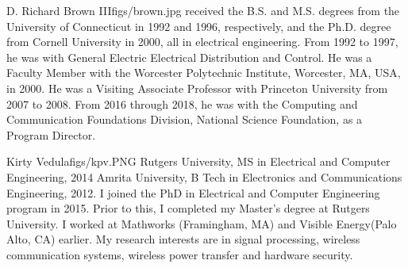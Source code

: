 \documentclass[twocolumn,letterpaper]{IEEEAerospaceCLS}  %
\begin{document}
\begin{biographywithpic}
{D. Richard Brown III}{figs/brown.jpg}
received the B.S. and M.S. degrees from the University of Connecticut in 1992 and 1996, respectively, and the Ph.D. degree from Cornell University
in 2000, all in electrical engineering. From 1992
to 1997, he was with General Electric Electrical
Distribution and Control. He was a Faculty Member
with the Worcester Polytechnic Institute, Worcester,
MA, USA, in 2000. He was a Visiting Associate
Professor with Princeton University from 2007 to
2008. From 2016 through 2018, he was with the Computing
and Communication Foundations Division, National Science Foundation, as
a Program Director.
\end{biographywithpic}

\begin{biographywithpic}
{Kirty Vedula}{figs/kpv.PNG}
Rutgers University, MS in Electrical and Computer Engineering, 2014 Amrita University, B Tech in Electronics and Communications Engineering, 2012. I joined the PhD in Electrical and Computer Engineering program in 2015. Prior to this, I completed my Master's degree at Rutgers University. I worked at Mathworks (Framingham, MA) and Visible Energy(Palo Alto, CA) earlier. My research interests are in signal processing, wireless communication systems, wireless power transfer and hardware security.
\end{biographywithpic}
\end{document}
